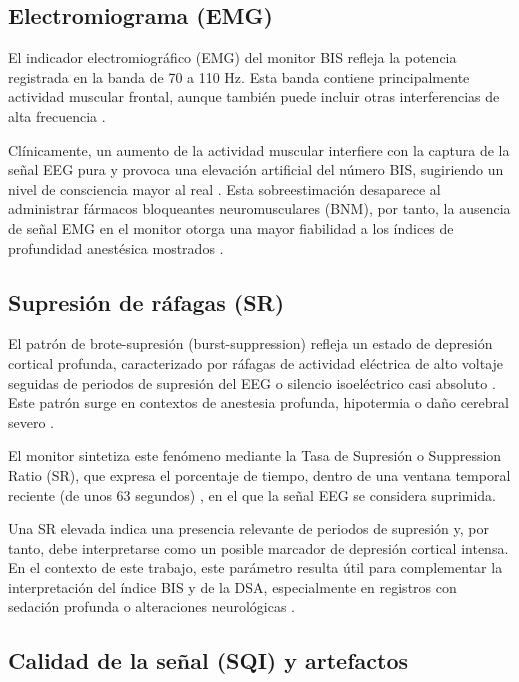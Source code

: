 \documentclass[
  spanish,
  a4paper,
  12pt,
  twoside]{memoir}
\begin{document}
\subsection{Electromiograma (EMG)}\label{electromiograma-emg}

El indicador electromiográfico (EMG) del monitor BIS refleja la potencia
registrada en la banda de 70 a 110 Hz. Esta banda contiene
principalmente actividad muscular frontal, aunque también puede incluir
otras interferencias de alta frecuencia \citep{SaboyaSnchez2009}.

Clínicamente, un aumento de la actividad muscular interfiere con la
captura de la señal EEG pura y provoca una elevación artificial del
número BIS, sugiriendo un nivel de consciencia mayor al real
\citep{SaboyaSnchez2009}. Esta sobreestimación desaparece al administrar
fármacos bloqueantes neuromusculares (BNM), por tanto, la ausencia de
señal EMG en el monitor otorga una mayor fiabilidad a los índices de
profundidad anestésica mostrados \citep{SaboyaSnchez2009}.

\subsection{Supresión de ráfagas
(SR)}\label{supresiuxf3n-de-ruxe1fagas-sr}

El patrón de brote-supresión (burst-suppression) refleja un estado de
depresión cortical profunda, caracterizado por ráfagas de actividad
eléctrica de alto voltaje seguidas de periodos de supresión del EEG o
silencio isoeléctrico casi absoluto \citep{OchoaSolana2025}. Este patrón
surge en contextos de anestesia profunda, hipotermia o daño cerebral
severo \citep{OchoaSolana2025}.

El monitor sintetiza este fenómeno mediante la Tasa de Supresión o
Suppression Ratio (SR), que expresa el porcentaje de tiempo, dentro de
una ventana temporal reciente (de unos 63 segundos)
\citep{CovidienBISadvanced}, en el que la señal EEG se considera
suprimida.

Una SR elevada indica una presencia relevante de periodos de supresión
y, por tanto, debe interpretarse como un posible marcador de depresión
cortical intensa. En el contexto de este trabajo, este parámetro resulta
útil para complementar la interpretación del índice BIS y de la DSA,
especialmente en registros con sedación profunda o alteraciones
neurológicas \citep{OchoaSolana2025}.

\subsection{Calidad de la señal (SQI) y
artefactos}\label{calidad-de-la-seuxf1al-sqi-y-artefactos}
\end{document}

